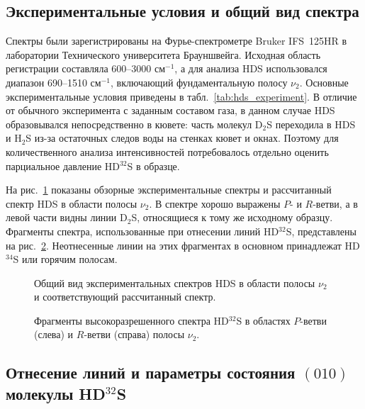\subsection{Экспериментальные условия и общий вид спектра}

Спектры были зарегистрированы на Фурье-спектрометре Bruker IFS~125HR в лаборатории Технического
университета Брауншвейга. Исходная область регистрации составляла 600--3000 см$^{-1}$, а для анализа
HDS использовался диапазон 690--1510 см$^{-1}$, включающий фундаментальную полосу $\nu_2$. Основные
экспериментальные условия приведены в табл.~\ref{tab:hds_experiment}. В отличие от обычного
эксперимента с заданным составом газа, в данном случае HDS образовывался непосредственно в кювете:
часть молекул D$_2$S переходила в HDS и H$_2$S из-за остаточных следов воды на стенках кювет и окнах.
Поэтому для количественного анализа интенсивностей потребовалось отдельно оценить парциальное давление
HD$^{32}$S в образце.



На рис.~\ref{fig:hds_overview} показаны обзорные экспериментальные спектры и рассчитанный спектр HDS в
области полосы $\nu_2$. В спектре хорошо выражены $P$- и $R$-ветви, а в левой части видны линии
D$_2$S, относящиеся к тому же исходному образцу. Фрагменты спектра, использованные при отнесении
линий HD$^{32}$S, представлены на рис.~\ref{fig:hds_fragments}. Неотнесенные линии на этих фрагментах в
основном принадлежат HD$^{34}$S или горячим полосам.

\begin{figure}[htbp]
    \centering
    \caption{Общий вид экспериментальных спектров HDS в области полосы $\nu_2$ и соответствующий
    рассчитанный спектр.}
    \label{fig:hds_overview}
\end{figure}

\begin{figure}[htbp]
    \centering
    \hfill
    \caption{Фрагменты высокоразрешенного спектра HD$^{32}$S в областях $P$-ветви (слева) и
    $R$-ветви (справа) полосы $\nu_2$.}
    \label{fig:hds_fragments}
\end{figure}

\subsection{Отнесение линий и параметры состояния $(010)$ молекулы HD$^{32}$S}

